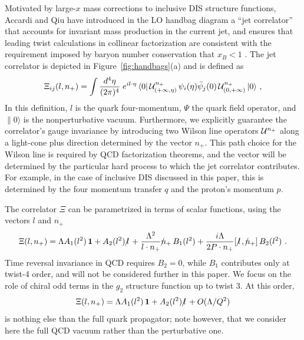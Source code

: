 \documentclass[preprintnumbers,floatfix,nofootinbib]{revtex4}
\newcommand{\lslash}{l \hspace{-0.19cm} / \,}
\newcommand{\nslash}{n \hspace{-0.24cm} / \,}
\newcommand{\de}{d}                    %
\begin{document}
Motivated by large-$x$ mass corrections to inclusive DIS structure functions, Accardi and Qiu have introduced in the LO handbag diagram a ``jet correlator'' that accounts for invariant mass production in the current jet, and ensures that leading twist calculations in collinear factorization are consistent with the requirement imposed by baryon number conservation that $x_B<1$ \cite{Accardi-Qiu}. The jet correlator is depicted in Figure~\ref{fig:handbags}(a) and is defined as
\begin{align} 
\Xi_{ij}(l,n_+) =\int
  \frac{\de^4\eta}{(2\pi)^4}\; e^{i l \cdot \eta}\,
    \langle 0|\, {\cal U}^{n_+}_{(+\infty,\eta)}
\,\psi_i(\eta)
             \bar{\psi}_j(0)\,
{\cal U}^{n_+}_{(0,+\infty)}\,   |0 \rangle \ ,
\label{e:xifull}
\end{align} 
In this definition, $l$ is the quark four-momentum, $\Psi$ the quark field operator, and $\|0\rangle$ is the nonperturbative vacuum. Furthermore, we explicitly guarantee the correlator's gauge invariance by introducing two Wilson line operators ${\cal U}^{n_+}$ along a light-cone plus direction determined by the vector $n_+$. This path choice for the Wilson line is required by QCD factorization theorems, and the vector will be determined by the particular hard process to which the jet correlator contributes. For example, in the case of inclusive DIS discussed in this paper, this is determined by the four momentum transfer $q$ and the proton's momentum $p$.

The correlator $\Xi$ can be parametrized in terms of scalar functions, using the vectors $l$ and $n_+$ 
\begin{equation}
\Xi(l,n_+) = \Lambda A_1(l^2)\,{\bm 1} + A_2(l^2)\,\lslash 
+ \frac{\Lambda^2}{l \cdot n_{+}} \nslash_+ \, B_{1}(l^2)
+ \frac{i \Lambda}{2 P \cdot n_{+}} [\,\lslash,\nslash_+ ] \, B_{2}(l^2) \ .
\label{e:jetexpansion}
\end{equation} 
Time reversal invariance in QCD requires $B_{2}=0$, while $B_{1}$ contributes
only at twist-4 order, and will not be considered further in this paper. We
focus on the role of chiral odd terms in the $g_2$ structure function up to
twist 3.  At this order, 
\begin{equation}
  \Xi(l,n_+) = \Lambda A_1(l^2)\,{\bm 1} + A_2(l^2)\,\lslash 
    + O(\Lambda/Q^2)
\label{e:jetexpansion-tw3}
\end{equation} 
is nothing else than the full quark propagator; note however, that we consider
here the full QCD vacuum rather than the perturbative one.  
\end{document}
